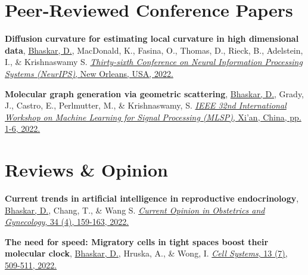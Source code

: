\documentclass[margin,line]{res}
\begin{document}
\begin{resume}
\section{\sc Peer-Reviewed Conference Papers}
{\renewcommand\leftmargini{0em}
\begin{etaremune}[start=2]
\item{\bf Diffusion curvature for estimating local curvature in high dimensional data},
\underline{Bhaskar, D.}, MacDonald, K., Fasina, O., Thomas, D., Rieck, B., Adelstein, I., \& Krishnaswamy S.
\href{https://arxiv.org/abs/2206.03977}{\textit{Thirty-sixth Conference on Neural Information Processing Systems (NeurIPS)}, New Orleans, USA, 2022.}
\item{\bf Molecular graph generation via geometric scattering},
\underline{Bhaskar, D.}, Grady, J., Castro, E., Perlmutter, M., \& Krishnaswamy, S.
\href{https://doi.org/10.1109/MLSP55214.2022.9943379}{\textit{IEEE 32nd International Workshop on Machine Learning for Signal Processing (MLSP)}, Xi'an, China, pp. 1-6, 2022.}
\end{etaremune}
}

\vspace*{.15cm}

\section{\sc Reviews \& Opinion}
{\renewcommand\leftmargini{0em}
\begin{etaremune}[start=2]
\item{\bf Current trends in artificial intelligence in reproductive endocrinology},
\underline{Bhaskar, D.}, Chang, T., \& Wang S.
\href{https://doi.org/10.1097/GCO.0000000000000796}{\textit{Current Opinion in Obstetrics and Gynecology}, 34 (4), 159-163, 2022.}
\item{\bf The need for speed: Migratory cells in tight spaces boost their molecular clock},
\underline{Bhaskar, D.}, Hruska, A., \& Wong, I.
\href{https://doi.org/10.1016/j.cels.2022.06.002}{\textit{Cell Systems}, 13 (7), 509-511, 2022.}
\end{etaremune}
}

\vspace*{.15cm}


\end{resume}
\end{document}

